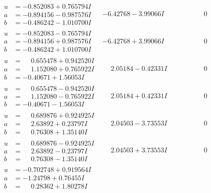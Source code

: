 \documentclass[1p]{elsarticle_modified}
\theoremstyle{definition}
\begin{document}
$$\begin{array}{c|c|c}
\begin{aligned}
u &= -0.852083 + 0.765794 I \\
a &= -0.894156 - 0.987576 I \\
b &= -0.486242 - 1.010700 I\end{aligned}
 & -6.42768 - 3.99066 I & \phantom{-0.000000 } 0 \\ \hline\begin{aligned}
u &= -0.852083 - 0.765794 I \\
a &= -0.894156 + 0.987576 I \\
b &= -0.486242 + 1.010700 I\end{aligned}
 & -6.42768 + 3.99066 I & \phantom{-0.000000 } 0 \\ \hline\begin{aligned}
u &= \phantom{-}0.655478 + 0.942520 I \\
a &= \phantom{-}1.152080 + 0.765922 I \\
b &= -0.40671 + 1.56053 I\end{aligned}
 & \phantom{-}2.05184 - 0.42331 I & \phantom{-0.000000 } 0 \\ \hline\begin{aligned}
u &= \phantom{-}0.655478 - 0.942520 I \\
a &= \phantom{-}1.152080 - 0.765922 I \\
b &= -0.40671 - 1.56053 I\end{aligned}
 & \phantom{-}2.05184 + 0.42331 I & \phantom{-0.000000 } 0 \\ \hline\begin{aligned}
u &= \phantom{-}0.689876 + 0.924925 I \\
a &= \phantom{-}2.63892 + 0.23797 I \\
b &= \phantom{-}0.76308 + 1.35140 I\end{aligned}
 & \phantom{-}2.04503 - 3.73553 I & \phantom{-0.000000 } 0 \\ \hline\begin{aligned}
u &= \phantom{-}0.689876 - 0.924925 I \\
a &= \phantom{-}2.63892 - 0.23797 I \\
b &= \phantom{-}0.76308 - 1.35140 I\end{aligned}
 & \phantom{-}2.04503 + 3.73553 I & \phantom{-0.000000 } 0 \\ \hline\begin{aligned}
u &= -0.702748 + 0.919564 I \\
a &= -1.24798 + 0.76455 I \\
b &= \phantom{-}0.28362 + 1.80278 I\end{aligned}

\end{array}$$
\end{document}
